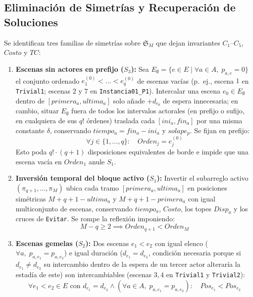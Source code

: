 \subsection{Eliminación de Simetrías y Recuperación de Soluciones}
\label{subsec:simetrias}

Se identifican tres familias de simetrías sobre $\mathfrak{S}_M$ que dejan invariantes $C_1$--$C_5$, $Costo$ y $TC$:
\begin{enumerate}
    \item \textbf{Escenas sin actores en prefijo ($S_3$):} Sea $E_{\emptyset} = \{e \in E \mid \forall a \in A,\; p_{a,e} = 0\}$ el conjunto ordenado $e^{(0)}_1 < \dots < e^{(0)}_q$ de escenas vacías (p.\ ej., escena $1$ en \texttt{Trivial1}; escenas $2$ y $7$ en \texttt{Instancia01\_P1}). Intercalar una escena $e_0 \in E_{\emptyset}$ dentro de $[primera_a, ultima_a]$ solo añade $+d_{e_0}$ de espera innecesaria; en cambio, situar $E_{\emptyset}$ fuera de todos los intervalos actorales (en prefijo o sufijo, en cualquiera de sus $q!$ órdenes) traslada cada $[ini_a, fin_a]$ por una misma constante $\delta$, conservando $tiempo_a = fin_a - ini_a$ y $solape_p$. Se fijan en prefijo:
    \begin{equation}
        \forall j \in \{1, \dots, q\}: \quad Orden_j = e^{(0)}_j
        \label{eq:s3_vacias}
    \end{equation}
    Esto poda $q! \cdot (q + 1)$ disposiciones equivalentes de borde e impide que una escena vacía en $Orden_1$ anule $S_1$.

    \item \textbf{Inversión temporal del bloque activo ($S_1$):} Invertir el subarreglo activo $(\pi_{q+1}, \dots, \pi_M)$ ubica cada tramo $[primera_a, ultima_a]$ en posiciones simétricas $M + q + 1 - ultima_a$ y $M + q + 1 - primera_a$ con igual multiconjunto de escenas, conservando $tiempo_a$, $Costo$, los topes $Disp_a$ y los cruces de \texttt{Evitar}. Se rompe la reflexión imponiendo:
    \begin{equation}
        M - q \ge 2 \implies Orden_{q+1} < Orden_M
        \label{eq:s1_inversion}
    \end{equation}

    \item \textbf{Escenas gemelas ($S_2$):} Dos escenas $e_1 < e_2$ con igual elenco ($\forall a,\; p_{a,e_1} = p_{a,e_2}$) e igual duración ($d_{e_1} = d_{e_2}$, condición necesaria porque si $d_{e_1} \neq d_{e_2}$ su intercambio dentro de la espera de un tercer actor alteraría la estadía de este) son intercambiables (escenas $3, 4$ en \texttt{Trivial1} y \texttt{Trivial2}):
    \begin{equation}
        \forall e_1 < e_2 \in E \text{ con } d_{e_1} = d_{e_2} \land (\forall a \in A,\; p_{a,e_1} = p_{a,e_2}): \quad Pos_{e_1} < Pos_{e_2}
        \label{eq:s2_gemelas}
    \end{equation}
\end{enumerate}

